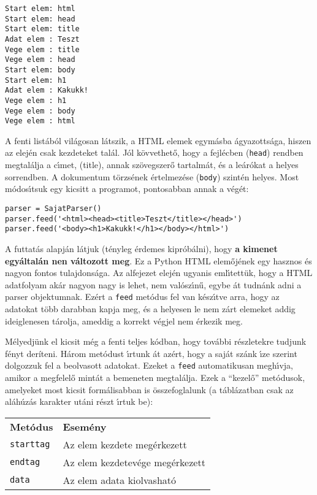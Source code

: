 \begin{Verbatim}[fontsize=\small]
Start elem: html
Start elem: head
Start elem: title
Adat elem : Teszt
Vege elem : title
Vege elem : head
Start elem: body
Start elem: h1
Adat elem : Kakukk!
Vege elem : h1
Vege elem : body
Vege elem : html
\end{Verbatim}

\noindent A fenti list\'ab\'ol vil\'agosan l\'atszik, a HTML elemek egym\'asba \'agyazotts\'aga, 
hiszen az elej\'en csak kezdeteket tal\'al. J\'ol k\"ovvethet\H{o}, hogy a fejl\'ecben ({\tt head}) 
rendben megtal\'alja a c\'{\i}met, ({title}), annak sz\"ovegszer\H{o} tartalm\'at, \'es a le\'ar\'okat 
a helyes sorrendben. A dokumentum t\"orzs\'enek \'ertelmez\'ese ({\tt body}) szint\'en helyes. 
Most m\'odos\'{\i}tsuk egy kicsitt a programot, pontosabban annak a v\'eg\'et:

\begin{Verbatim}[fontsize=\small]
parser = SajatParser()
parser.feed('<html><head><title>Teszt</title></head>')
parser.feed('<body><h1>Kakukk!</h1></body></html>')
\end{Verbatim}

\noindent A futtat\'as alapj\'an l\'atjuk (t\'enyleg \'erdemes kipr\'ob\'alni), hogy {\bf a kimenet 
egy\'al\-ta\-l\'an nen v\'altozott meg}. Ez a Python HTML elem\H{o}j\'enek egy hasznos \'es nagyon fontos 
tulajdons\'aga. Az alfejezet elej\'en ugyanis eml\'{\i}tett\"uk, hogy a HTML adatfolyam ak\'ar nagyon 
nagy is lehet, nem val\'osz\'{\i}n\H{u}, egybe \'at tudn\'ank adni a parser objektumnak. Ez\'ert a 
{\tt feed} met\'odus fel van k\'esz\'{\i}tve arra, hogy az adatokat t\"obb darabban kapja meg, 
\'es a helyesen le nem z\'art elemeket addig ideiglenesen t\'arolja, ameddig a korrekt v\'egjel nem 
\'erkezik meg.

M\'elyedj\"unk el kicsit m\'eg a fenti teljes k\'odban, hogy tov\'abbi r\'eszletekre tudjunk 
f\'enyt der\'iteni. H\'arom met\'odust \'{\i}rtunk \'at az\'ert, hogy a saj\'at sz\'ank \'{\i}ze 
szerint dolgozzuk fel a beolvasott adatokat. Ezeket a {\tt feed} automatikusan megh\'{\i}vja, 
amikor a megfelel\H{o} mint\'at a bemeneten megtal\'alja. Ezek a ``kezel\H{o}'' met\'odusok, 
amelyeket most kicsit form\'alisabban is \"osszefoglalunk (a t\'abl\'azatban csak az 
al\'ah\'uz\'as karakter ut\'ani r\'eszt \'{\i}rtuk be):

\begin{center}
   \begin{tabular}{ll}
   {\bf Met\'odus} & {\bf Esem\'eny} \\
   {\tt starttag} & Az elem kezdete meg\'erkezett \\
   {\tt endtag} & Az elem kezdetev\'ege meg\'erkezett \\
   {\tt data} & Az elem adata kiolvashat\'o \\
   \end {tabular}
\end{center}

